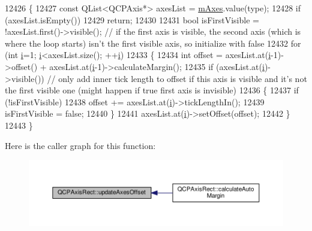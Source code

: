 \begin{DoxyCode}
12426 \{
12427   \textcolor{keyword}{const} QList<QCPAxis*> axesList = \hyperlink{class_q_c_p_axis_rect_afe7a24d2a2bea98fc552fa826350ba81}{mAxes}.value(type);
12428   \textcolor{keywordflow}{if} (axesList.isEmpty())
12429     \textcolor{keywordflow}{return};
12430   
12431   \textcolor{keywordtype}{bool} isFirstVisible = !axesList.first()->visible(); \textcolor{comment}{// if the first axis is visible, the second axis
       (which is where the loop starts) isn't the first visible axis, so initialize with false}
12432   \textcolor{keywordflow}{for} (\textcolor{keywordtype}{int} \hyperlink{_comparision_pictures_2_createtest_image_8m_a6f6ccfcf58b31cb6412107d9d5281426}{i}=1; \hyperlink{_comparision_pictures_2_createtest_image_8m_a6f6ccfcf58b31cb6412107d9d5281426}{i}<axesList.size(); ++\hyperlink{_comparision_pictures_2_createtest_image_8m_a6f6ccfcf58b31cb6412107d9d5281426}{i})
12433   \{
12434     \textcolor{keywordtype}{int} offset = axesList.at(\hyperlink{_comparision_pictures_2_createtest_image_8m_a6f6ccfcf58b31cb6412107d9d5281426}{i}-1)->offset() + axesList.at(\hyperlink{_comparision_pictures_2_createtest_image_8m_a6f6ccfcf58b31cb6412107d9d5281426}{i}-1)->calculateMargin();
12435     \textcolor{keywordflow}{if} (axesList.at(\hyperlink{_comparision_pictures_2_createtest_image_8m_a6f6ccfcf58b31cb6412107d9d5281426}{i})->visible()) \textcolor{comment}{// only add inner tick length to offset if this axis is visible and
       it's not the first visible one (might happen if true first axis is invisible)}
12436     \{
12437       \textcolor{keywordflow}{if} (!isFirstVisible)
12438         offset += axesList.at(\hyperlink{_comparision_pictures_2_createtest_image_8m_a6f6ccfcf58b31cb6412107d9d5281426}{i})->tickLengthIn();
12439       isFirstVisible = \textcolor{keyword}{false};
12440     \}
12441     axesList.at(\hyperlink{_comparision_pictures_2_createtest_image_8m_a6f6ccfcf58b31cb6412107d9d5281426}{i})->setOffset(offset);
12442   \}
12443 \}
\end{DoxyCode}


Here is the caller graph for this function\+:\nopagebreak
\begin{figure}[H]
\begin{center}
\leavevmode
\includegraphics[width=350pt]{class_q_c_p_axis_rect_a6024ccdc74f5dc0e8a0fe482e5b28a20_icgraph}
\end{center}
\end{figure}


